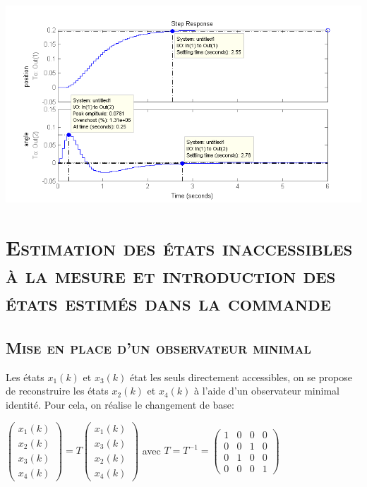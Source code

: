 	\begin{center}
	\includegraphics[scale=0.6]{step2.png}
	\label{fig7} 
	\end{center}
	
\chapter{\textsc{Estimation des états inaccessibles à la mesure et introduction des états estimés dans la commande}}
\section{\textsc{ Mise en place d'un observateur minimal }}

Les états $x_1(k)$ et $x_3(k)$ état les seuls directement accessibles, on se propose de reconstruire les états $x_2(k)$ et $x_4(k)$ à l'aide d'un observateur minimal identité. Pour cela, on réalise le changement de base:

\begin{center}

$\begin{pmatrix}
	  x_1(k) \\  x_2(k)  \\ x_3(k) \\   x_4(k)
\end{pmatrix}= T \begin{pmatrix}
	  x_1(k) \\  x_3(k)  \\ x_2(k) \\   x_4(k)
\end{pmatrix}$ avec $T=T^{-1}=\begin{pmatrix}
	  1 & 0 & 0 & 0 \\  0 & 0 & 1 & 0  \\ 0 & 1 & 0 & 0\\  0 & 0 & 0 & 1
\end{pmatrix}$
\end{center}

